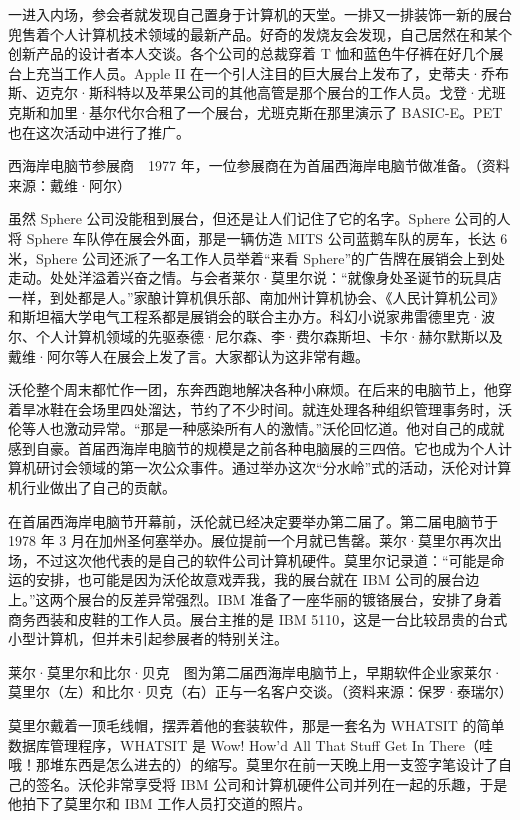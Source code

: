\documentclass[12pt,UTF8]{ctexbook}
\begin{document}
一进入内场，参会者就发现自己置身于计算机的天堂。一排又一排装饰一新的展台兜售着个人计算机技术领域的最新产品。好奇的发烧友会发现，自己居然在和某个创新产品的设计者本人交谈。各个公司的总裁穿着 T 恤和蓝色牛仔裤在好几个展台上充当工作人员。Apple II 在一个引人注目的巨大展台上发布了，史蒂夫·乔布斯、迈克尔·斯科特以及苹果公司的其他高管是那个展台的工作人员。戈登·尤班克斯和加里·基尔代尔合租了一个展台，尤班克斯在那里演示了 BASIC-E。PET 也在这次活动中进行了推广。



西海岸电脑节参展商　1977 年，一位参展商在为首届西海岸电脑节做准备。（资料来源：戴维·阿尔）

虽然 Sphere 公司没能租到展台，但还是让人们记住了它的名字。Sphere 公司的人将 Sphere 车队停在展会外面，那是一辆仿造 MITS 公司蓝鹅车队的房车，长达 6 米，Sphere 公司还派了一名工作人员举着“来看 Sphere”的广告牌在展销会上到处走动。处处洋溢着兴奋之情。与会者莱尔·莫里尔说：“就像身处圣诞节的玩具店一样，到处都是人。”家酿计算机俱乐部、南加州计算机协会、《人民计算机公司》和斯坦福大学电气工程系都是展销会的联合主办方。科幻小说家弗雷德里克·波尔、个人计算机领域的先驱泰德·尼尔森、李·费尔森斯坦、卡尔·赫尔默斯以及戴维·阿尔等人在展会上发了言。大家都认为这非常有趣。

沃伦整个周末都忙作一团，东奔西跑地解决各种小麻烦。在后来的电脑节上，他穿着旱冰鞋在会场里四处溜达，节约了不少时间。就连处理各种组织管理事务时，沃伦等人也激动异常。“那是一种感染所有人的激情。”沃伦回忆道。他对自己的成就感到自豪。首届西海岸电脑节的规模是之前各种电脑展的三四倍。它也成为个人计算机研讨会领域的第一次公众事件。通过举办这次“分水岭”式的活动，沃伦对计算机行业做出了自己的贡献。

在首届西海岸电脑节开幕前，沃伦就已经决定要举办第二届了。第二届电脑节于 1978 年 3 月在加州圣何塞举办。展位提前一个月就已售罄。莱尔·莫里尔再次出场，不过这次他代表的是自己的软件公司计算机硬件。莫里尔记录道：“可能是命运的安排，也可能是因为沃伦故意戏弄我，我的展台就在 IBM 公司的展台边上。”这两个展台的反差异常强烈。IBM 准备了一座华丽的镀铬展台，安排了身着商务西装和皮鞋的工作人员。展台主推的是 IBM 5110，这是一台比较昂贵的台式小型计算机，但并未引起参展者的特别关注。



莱尔·莫里尔和比尔·贝克　图为第二届西海岸电脑节上，早期软件企业家莱尔·莫里尔（左）和比尔·贝克（右）正与一名客户交谈。（资料来源：保罗·泰瑞尔）

莫里尔戴着一顶毛线帽，摆弄着他的套装软件，那是一套名为 WHATSIT 的简单数据库管理程序，WHATSIT 是 Wow! How'd All That Stuff Get In There（哇哦！那堆东西是怎么进去的）的缩写。莫里尔在前一天晚上用一支签字笔设计了自己的签名。沃伦非常享受将 IBM 公司和计算机硬件公司并列在一起的乐趣，于是他拍下了莫里尔和 IBM 工作人员打交道的照片。
\end{document}

